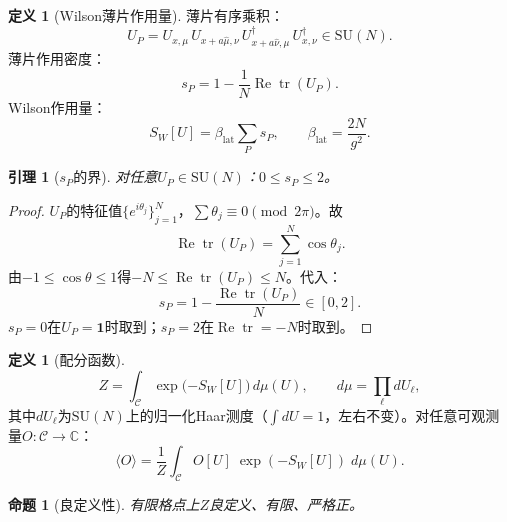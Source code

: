 \documentclass[12pt,a4paper]{article}
\theoremstyle{plain}
\newtheorem{lemma}[theorem]{引理}
\newtheorem{proposition}[theorem]{命题}
\theoremstyle{definition}
\newtheorem{definition}[theorem]{定义}
\theoremstyle{remark}
\begin{document}
\begin{definition}[Wilson薄片作用量]\label{def:wilson}
薄片有序乘积：
\begin{equation}\label{eq:UP}
U_P = U_{x,\mu}\,U_{x+a\hat\mu,\nu}\,U_{x+a\hat\nu,\mu}^\dagger\,U_{x,\nu}^\dagger \in \mathrm{SU}(N).
\end{equation}
薄片作用密度：
\begin{equation}\label{eq:sp}
s_P = 1 - \frac{1}{N}\operatorname{Re}\operatorname{tr}(U_P).
\end{equation}
Wilson作用量：
\begin{equation}\label{eq:SW}
S_W[U] = \beta_{\mathrm{lat}}\sum_P s_P, \qquad \beta_{\mathrm{lat}} = \frac{2N}{g^2}.
\end{equation}
\end{definition}

\begin{lemma}[$s_P$的界]\label{lem:sp}
对任意$U_P\in\mathrm{SU}(N)$：$0\leq s_P\leq 2$。
\end{lemma}

\begin{proof}
$U_P$的特征值$\{e^{i\theta_j}\}_{j=1}^N$，$\sum\theta_j\equiv 0\pmod{2\pi}$。故
\begin{equation}
\operatorname{Re}\operatorname{tr}(U_P) = \sum_{j=1}^N \cos\theta_j.
\end{equation}
由$-1\leq\cos\theta\leq 1$得$-N\leq\operatorname{Re}\operatorname{tr}(U_P)\leq N$。代入：
\begin{equation}
s_P = 1 - \frac{\operatorname{Re}\operatorname{tr}(U_P)}{N} \in [0,2].
\end{equation}
$s_P=0$在$U_P=\mathbf{1}$时取到；$s_P=2$在$\operatorname{Re}\operatorname{tr}=-N$时取到。
\end{proof}

\begin{definition}[配分函数]\label{def:Z}
\begin{equation}\label{eq:Z}
Z = \int_{\mathcal{C}} \exp\!\bigl({-S_W[U]}\bigr)\,d\mu(U), \qquad d\mu = \prod_\ell dU_\ell,
\end{equation}
其中$dU_\ell$为$\mathrm{SU}(N)$上的归一化Haar测度（$\int dU=1$，左右不变）。对任意可观测量$O:\mathcal{C}\to\mathbb{C}$：
\begin{equation}
\langle O \rangle = \frac{1}{Z}\int_{\mathcal{C}} O[U]\;\exp({-S_W[U]})\;d\mu(U).
\end{equation}
\end{definition}

\begin{proposition}[良定义性]\label{prop:wd}
有限格点上$Z$良定义、有限、严格正。
\end{proposition}
\end{document}
